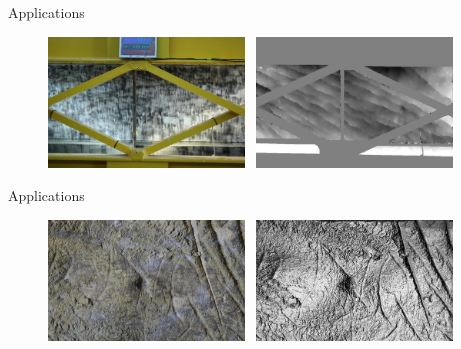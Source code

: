 \documentclass{beamer}
\begin{document}
		\begin{frame}{Applications}
			 
			\begin{figure}
			  \includegraphics[width=5.2cm]{../MicmacQuickMay2018/images/usage4a} \ 
			  \includegraphics[width=5.2cm]{../MicmacQuickMay2018/images/usage4b}
			\end{figure}
		\end{frame}	
		\begin{frame}{Applications}
			 
			\begin{figure}
			  \includegraphics[width=5.2cm]{../MicmacQuickMay2018/images/usage6a} \ 
			  \includegraphics[width=5.2cm]{../MicmacQuickMay2018/images/usage6b}
			\end{figure}
		\end{frame}	
\end{document}

